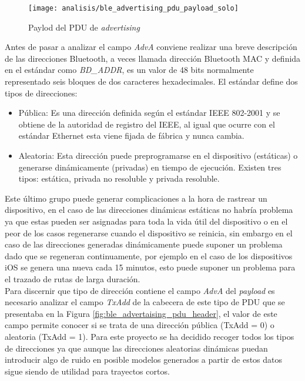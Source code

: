 \documentclass[../proyecto.tex]{subfiles}
\begin{document}
\begin{figure}[H]
\centering
\texttt{[image: analisis/ble\_advertising\_pdu\_payload\_solo]}
\caption{Paylod del PDU de \textit{advertising}}
\label{fig:ble_advertising_pdu_payload_solo}
\end{figure}

Antes de pasar a analizar el campo \textit{AdvA} conviene realizar una breve descripción de las direcciones Bluetooth, a veces llamada dirección Bluetooth MAC y definida en el estándar como \textit{BD\_ADDR}, es un valor de 48 bits normalmente representado seis bloques de dos caracteres hexadecimales. El estándar define dos tipos de direcciones:

\begin{itemize}
  \item Pública: Es una dirección definida según el estándar IEEE 802-2001 y se obtiene de la autoridad de registro del IEEE, al igual que ocurre con el estándar Ethernet esta viene fijada de fábrica y nunca cambia.
  \item Aleatoria: Esta dirección puede preprogramarse en el dispositivo (estáticas) o generarse dinámicamente (privadas) en tiempo de ejecución. Existen tres tipos: estática, privada no resoluble y privada resoluble.
\end{itemize}

Este último grupo puede generar complicaciones a la hora de rastrear un dispositivo, en el caso de las direcciones dinámicas estáticas no habría problema ya que estas pueden ser asignadas para toda la vida útil del dispositivo o en el peor de los casos regenerarse cuando el dispositivo se reinicia, sin embargo en el caso de las direcciones generadas dinámicamente puede suponer un problema dado que se regeneran continuamente, por ejemplo en el caso de los dispositivos iOS se genera una nueva cada 15 minutos, esto puede suponer un problema para el trazado de rutas de larga duración.\\

Para discernir que tipo de dirección contiene el campo \textit{AdvA} del \textit{payload} es necesario analizar el campo \textit{TxAdd} de la cabecera de este tipo de PDU que se presentaba en la Figura \ref{fig:ble_advertaising_pdu_header}, el valor de este campo permite conocer si se trata de una dirección pública (TxAdd = 0) o aleatoria (TxAdd = 1). Para este proyecto se ha decidido recoger todos los tipos de direcciones ya que aunque las direcciones aleatorias dinámicas puedan introducir algo de ruido en posible modelos generados a partir de estos datos sigue siendo de utilidad para trayectos cortos.
\end{document}
